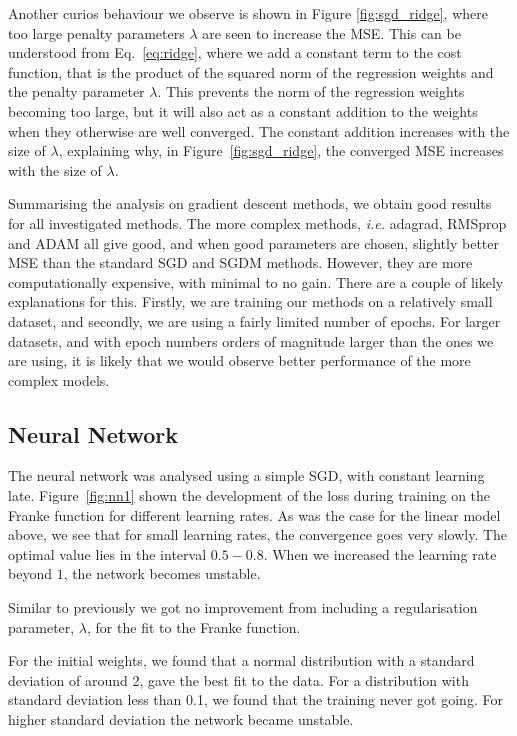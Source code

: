 \documentclass[a4paper, 
amsfonts, 
amssymb, 
amsmath, 
reprint, 
showkeys, 
nofootinbib, 
twoside]{revtex4-2}
\begin{document}
Another curios behaviour we observe is shown in Figure \ref{fig:sgd_ridge}, where too large penalty parameters $\lambda$ are seen to increase the MSE. This can be understood from Eq.~\eqref{eq:ridge}, where we add a constant term to the cost function, that is the product of the squared norm of the regression weights and the penalty parameter $\lambda$. This prevents the norm of the regression weights becoming too large, but it will also act as a constant addition to the weights when they otherwise are well converged. The constant addition increases with the size of $\lambda$, explaining why, in Figure~\ref{fig:sgd_ridge}, the converged MSE increases with the size of $\lambda$.

Summarising the analysis on gradient descent methods, we obtain good results for all investigated methods. The more complex methods, \textit{i.e.} adagrad, RMSprop and ADAM all give good, and when good parameters are chosen, slightly better MSE than the standard SGD and SGDM methods. However, they are more computationally expensive, with minimal to no gain. There are a couple of likely explanations for this. Firstly, we are training our methods on a relatively small dataset, and secondly, we are using a fairly limited number of epochs. For larger datasets, and with epoch numbers orders of magnitude larger than the ones we are using, it is likely that we would observe better performance of the more complex models. 

\subsection{Neural Network}

The neural network was analysed using a simple SGD, with constant learning late. Figure~\ref{fig:nn1} shown the development of the loss during training on the Franke function for different learning rates. As was the case for the linear model above, we see that for small learning rates, the convergence goes very slowly. The optimal value lies in the interval $0.5-0.8$. When we increased the learning rate beyond $1$, the network becomes unstable. 

Similar to previously we got no improvement from including a regularisation parameter, $\lambda$, for the fit to the Franke function. 

For the initial weights, we found that a normal distribution with a standard deviation of around 2, gave the best fit to the data. For a distribution with standard deviation less than 0.1, we found that the training never got going. For higher standard deviation the network became unstable.
\end{document}
